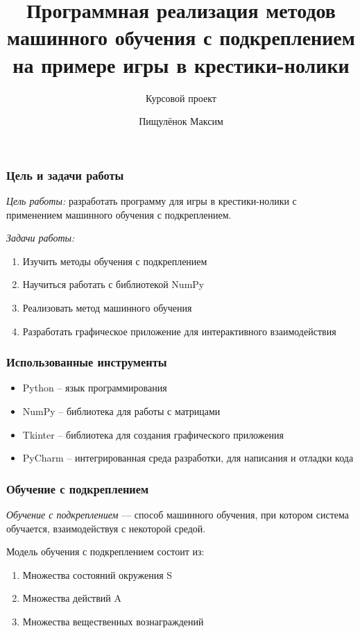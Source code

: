 \documentclass{beamer}
\title{Программная реализация методов машинного обучения с подкреплением на примере игры в крестики-нолики}
\subtitle{Курсовой проект}
\author{Пищулёнок Максим}
\institute[БГУ]{Белорусский государственный университет\\
Кафедра компьютерных технологий и систем}
\begin{document}
\begin{frame}
    \titlepage
\end{frame}

\begin{frame}
    \frametitle{Цель и задачи работы}

    \emph{Цель работы:} разработать программу для игры в крестики-нолики с применением машинного обучения с подкреплением.
    

    \emph{Задачи работы:}
    \begin{enumerate}
        \item Изучить методы обучения с подкреплением
        \item Научиться работать с библиотекой NumPy
        \item Реализовать метод машинного обучения
        \item Разработать графическое приложение для интерактивного взаимодействия
    \end{enumerate}

\end{frame}

\begin{frame}
    \frametitle{Использованные инструменты}

    \begin{itemize}
        \item Python – язык программирования
        \item NumPy – библиотека для работы с матрицами
        \item Tkinter – библиотека для создания графического приложения
        \item PyCharm – интегрированная среда разработки, для написания и отладки кода
    \end{itemize}
\end{frame}

\begin{frame}
    \frametitle{Обучение с подкреплением}

    \emph{Обучение с подкреплением} — способ машинного обучения, при котором система обучается, взаимодействуя с некоторой средой.

    Модель обучения с подкреплением состоит из:

    \begin{enumerate}
        \item Множества состояний окружения S
        \item Множества действий A
        \item Множества вещественных вознаграждений
    \end{enumerate}

\end{frame}
\end{document}
